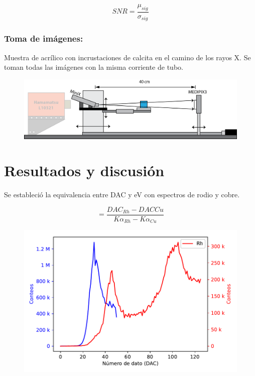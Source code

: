 \documentclass{sciposter}
\begin{document}
\begin{multicols}{3}
	\begin{equation}
	SNR=\frac{\mu_{sig}}{\sigma_{sig}}
	\end{equation}
	
	\subsubsection{Toma de imágenes:}
	Muestra de acrílico con incrustaciones de calcita en el camino de los rayos X.
	Se toman todas las imágenes con la misma corriente de tubo.
	
	\begin{figure}[h]
		\centering
		\includegraphics[width = \linewidth]{Figuras/Ag_Ima.png}
	\end{figure}

\section{Resultados y discusión}
	Se estableció la equivalencia entre DAC y eV con espectros de rodio y cobre.
	
	\begin{equation}
	[\frac{DAC}{eV}]=\frac{DAC_{Rh}-DAC{Cu}}{K\alpha_{Rh}-K\alpha_{Cu}}
	\end{equation}
	
	\begin{figure}[h]
		\centering
		\includegraphics[width = 0.9\linewidth]{Figuras/CalibracionE.pdf}
	\end{figure}


\end{multicols}
\end{document}

